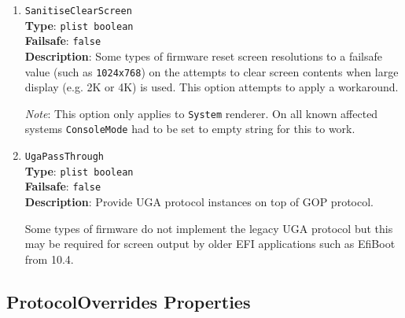 \documentclass[]{article}
\begin{document}
\begin{enumerate}
\item
  \texttt{SanitiseClearScreen}\\
  \textbf{Type}: \texttt{plist\ boolean}\\
  \textbf{Failsafe}: \texttt{false}\\
  \textbf{Description}: Some types of firmware reset screen resolutions to a failsafe
  value (such as \texttt{1024x768}) on the attempts to clear screen contents
  when large display (e.g. 2K or 4K) is used. This option attempts to apply
  a workaround.

  \emph{Note}: This option only applies to \texttt{System} renderer.
   On all known affected systems \texttt{ConsoleMode} had to be set to
   empty string for this to work.

\item
  \texttt{UgaPassThrough}\\
  \textbf{Type}: \texttt{plist\ boolean}\\
  \textbf{Failsafe}: \texttt{false}\\
  \textbf{Description}: Provide UGA protocol instances on top of GOP protocol.

  Some types of firmware do not implement the legacy UGA protocol but this may be required
  for screen output by older EFI applications such as EfiBoot from 10.4.

\end{enumerate}


\subsection{ProtocolOverrides Properties}\label{uefiprotoprops}
\end{document}

